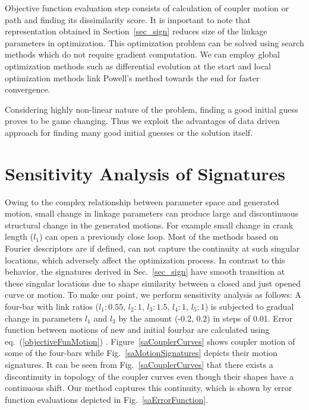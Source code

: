 \documentclass[twocolumn,10pt]{asme2e}
\newcommand{\req}[1]{(\ref{#1})}
\begin{document}
Objective function evaluation step consists of calculation of coupler motion or path and finding its dissimilarity score.
It is important to note that representation obtained in Section~\ref{sec_sign} reduces size of the linkage parameters in optimization.
This optimization problem can be solved using search methods which do not require gradient computation.
We can employ global optimization methods such as differential evolution at the start and local optimization methods link Powell's method towards the end for faster convergence\cite{ullah1997}.

Considering highly non-linear nature of the problem, finding a good initial guess proves to be game changing.
Thus we exploit the advantages of data driven approach for finding many good initial guesses or the solution itself.

\section{Sensitivity Analysis of Signatures}\label{sec_SA}
Owing to the complex relationship between parameter space and generated motion, small change in linkage parameters can produce large and discontinuous structural change in the generated motions.
For example small change in crank length ($l_1$) can open a previously close loop.
Most of the methods based on Fourier descriptors are if defined, can not capture the continuity at such singular locations, which adversely affect the optimization process.
In contrast to this behavior, the signatures derived in Sec.~\ref{sec_sign} have smooth transition at these singular locations due to shape similarity between a closed and just opened curve or motion.
To make our point, we perform sensitivity analysis as follows:
A four-bar with link ratios ($l_1:0.55$, $l_2:1$, $l_3:1.5$, $l_4:1$, $l_5:1$) is subjected to gradual change in parameters $l_1$ and $l_3$ by the amount (-0.2, 0.2) in steps of 0.01.
Error function between motions of new and initial fourbar are calculated using eq.~\req{objectiveFunMotion} .
Figure~\ref{saCouplerCurves} shows coupler motion of some of the four-bars while Fig.~\ref{saMotionSignatures} depicts their motion signatures.
It can be seen from Fig.~\ref{saCouplerCurves} that there exists a discontinuity in topology of the coupler curves even though their shapes have a continuous shift.
Our method captures this continuity, which is shown by error function evaluations depicted in Fig.~\ref{saErrorFunction}.
\end{document}
